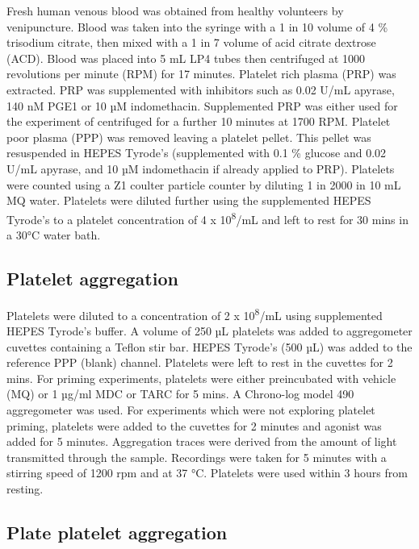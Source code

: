 \documentclass[11pt,twoside]{bristolthesis}
\begin{document}
Fresh human venous blood was obtained from healthy volunteers by venipuncture. Blood was taken into the syringe with a 1 in 10 volume of 4 \% trisodium citrate, then mixed with a 1 in 7 volume of acid citrate dextrose (ACD). Blood was placed into 5 mL LP4 tubes then centrifuged at 1000 revolutions per minute (RPM) for 17 minutes. Platelet rich plasma (PRP) was extracted. PRP was supplemented with inhibitors such as 0.02 U/mL apyrase, 140 nM PGE1 or 10 µM indomethacin. Supplemented PRP was either used for the experiment of centrifuged for a further 10 minutes at 1700 RPM. Platelet poor plasma (PPP) was removed leaving a platelet pellet. This pellet was resuspended in HEPES Tyrode's (supplemented with 0.1 \% glucose and 0.02 U/mL apyrase, and 10 µM indomethacin if already applied to PRP). Platelets were counted using a Z1 coulter particle counter by diluting 1 in 2000 in 10 mL MQ water. Platelets were diluted further using the supplemented HEPES Tyrode's to a platelet concentration of 4 x 10\textsuperscript{8}/mL and left to rest for 30 mins in a 30°C water bath.

\hypertarget{platelet-aggregation}{%
\subsection{Platelet aggregation}\label{platelet-aggregation}}

Platelets were diluted to a concentration of 2 x 10\textsuperscript{8}/mL using supplemented HEPES Tyrode's buffer. A volume of 250 µL platelets was added to aggregometer cuvettes containing a Teflon stir bar. HEPES Tyrode's (500 µL) was added to the reference PPP (blank) channel. Platelets were left to rest in the cuvettes for 2 mins. For priming experiments, platelets were either preincubated with vehicle (MQ) or 1 µg/ml MDC or TARC for 5 mins. A Chrono-log model 490 aggregometer was used. For experiments which were not exploring platelet priming, platelets were added to the cuvettes for 2 minutes and agonist was added for 5 minutes. Aggregation traces were derived from the amount of light transmitted through the sample. Recordings were taken for 5 minutes with a stirring speed of 1200 rpm and at 37 °C. Platelets were used within 3 hours from resting.

\hypertarget{plate-platelet-aggregation}{%
\subsection{Plate platelet aggregation}\label{plate-platelet-aggregation}}
\end{document}

